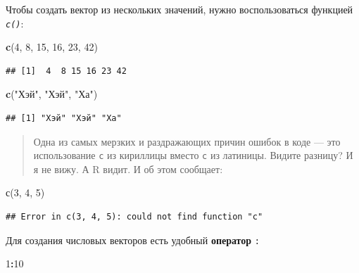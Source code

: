 \documentclass[
]{book}
\newenvironment{Shaded}{\begin{snugshade}}{\end{snugshade}}
\newcommand{\DecValTok}[1]{\textcolor[rgb]{0.00,0.00,0.81}{#1}}
\newcommand{\KeywordTok}[1]{\textcolor[rgb]{0.13,0.29,0.53}{\textbf{#1}}}
\newcommand{\NormalTok}[1]{#1}
\newcommand{\OperatorTok}[1]{\textcolor[rgb]{0.81,0.36,0.00}{\textbf{#1}}}
\newcommand{\StringTok}[1]{\textcolor[rgb]{0.31,0.60,0.02}{#1}}
\begin{document}
Чтобы создать вектор из нескольких значений, нужно воспользоваться функцией \emph{\texttt{c()}}:

\begin{Shaded}
\begin{Highlighting}[]
\KeywordTok{c}\NormalTok{(}\DecValTok{4}\NormalTok{, }\DecValTok{8}\NormalTok{, }\DecValTok{15}\NormalTok{, }\DecValTok{16}\NormalTok{, }\DecValTok{23}\NormalTok{, }\DecValTok{42}\NormalTok{)}
\end{Highlighting}
\end{Shaded}

\begin{verbatim}
## [1]  4  8 15 16 23 42
\end{verbatim}

\begin{Shaded}
\begin{Highlighting}[]
\KeywordTok{c}\NormalTok{(}\StringTok{"Хэй"}\NormalTok{, }\StringTok{"Хэй"}\NormalTok{, }\StringTok{"Ха"}\NormalTok{)}
\end{Highlighting}
\end{Shaded}

\begin{verbatim}
## [1] "Хэй" "Хэй" "Ха"
\end{verbatim}

\begin{quote}
Одна из самых мерзких и раздражающих причин ошибок в коде --- это использование \texttt{с} из кириллицы вместо \texttt{c} из латиницы. Видите разницу? И я не вижу. А R видит. И об этом сообщает:
\end{quote}

\begin{Shaded}
\begin{Highlighting}[]
\NormalTok{с(}\DecValTok{3}\NormalTok{, }\DecValTok{4}\NormalTok{, }\DecValTok{5}\NormalTok{)}
\end{Highlighting}
\end{Shaded}

\begin{verbatim}
## Error in с(3, 4, 5): could not find function "с"
\end{verbatim}

Для создания числовых векторов есть удобный \textbf{оператор} \texttt{:}

\begin{Shaded}
\begin{Highlighting}[]
\DecValTok{1}\OperatorTok{:}\DecValTok{10}
\end{Highlighting}
\end{Shaded}
\end{document}
